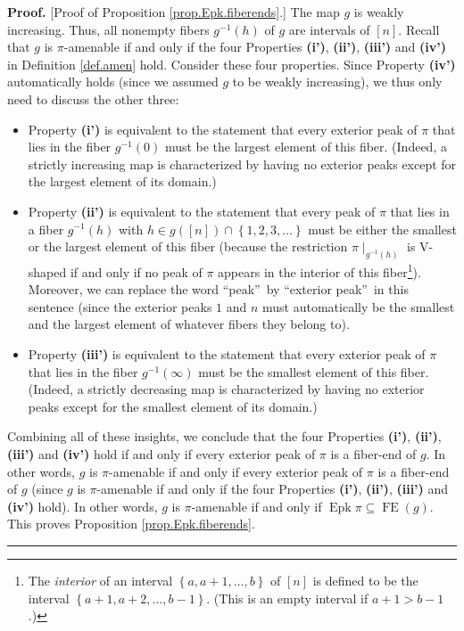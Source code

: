 \documentclass[numbers=enddot,12pt,final,onecolumn,notitlepage]{scrartcl}%
\theoremstyle{definition}
\newenvironment{proof}[1][Proof]{\noindent\textbf{#1.} }{\ \rule{0.5em}{0.5em}}
\newenvironment{vershort}{}{}
\begin{document}
\begin{vershort}
\begin{proof}
[Proof of Proposition \ref{prop.Epk.fiberends}.] The map $g$ is weakly
increasing. Thus, all nonempty fibers $g^{-1}\left(  h\right)  $ of $g$ are
intervals of $\left[  n\right]  $. Recall that $g$ is $\pi$-amenable if and
only if the four Properties \textbf{(i')}, \textbf{(ii')}, \textbf{(iii')} and
\textbf{(iv')} in Definition \ref{def.amen} hold. Consider these four
properties. Since Property \textbf{(iv')} automatically holds (since we
assumed $g$ to be weakly increasing), we thus only need to discuss the other three:

\begin{itemize}
\item Property \textbf{(i')} is equivalent to the statement that every
exterior peak of $\pi$ that lies in the fiber $g^{-1}\left(  0\right)  $ must
be the largest element of this fiber. (Indeed, a strictly increasing map is
characterized by having no exterior peaks except for the largest element
of its domain.)

\item Property \textbf{(ii')} is equivalent to the statement that every peak
of $\pi$ that lies in a fiber $g^{-1}\left(  h\right)  $ with $h\in g\left(
\left[  n\right]  \right)  \cap\left\{  1,2,3,\ldots\right\}  $ must be either
the smallest or the largest element of this fiber (because the restriction
$\pi\mid_{g^{-1}\left(  h\right)  }$ is V-shaped if and only if no peak of
$\pi$ appears in the interior of this fiber\footnote{The \textit{interior} of
an interval $\left\{  a,a+1,\ldots,b\right\}  $ of $\left[  n\right]  $ is
defined to be the interval $\left\{  a+1,a+2,\ldots,b-1\right\}  $. (This is
an empty interval if $a+1>b-1$.)}). Moreover, we can replace the word
\textquotedblleft peak\textquotedblright\ by \textquotedblleft exterior
peak\textquotedblright\ in this sentence (since the exterior peaks $1$ and $n$
must automatically be the smallest and the largest element of whatever fibers
they belong to).

\item Property \textbf{(iii')} is equivalent to the statement that every
exterior peak of $\pi$ that lies in the fiber $g^{-1}\left(  \infty\right)  $
must be the smallest element of this fiber. (Indeed, a strictly decreasing map
is characterized by having no exterior peaks except for the smallest element
of its domain.)
\end{itemize}

Combining all of these insights, we conclude that the four Properties
\textbf{(i')}, \textbf{(ii')}, \textbf{(iii')} and \textbf{(iv')} hold if and
only if every exterior peak of $\pi$ is a fiber-end of $g$. In other words,
$g$ is $\pi$-amenable if and only if every exterior peak of $\pi$ is a
fiber-end of $g$ (since $g$ is $\pi$-amenable if and only if the four
Properties \textbf{(i')}, \textbf{(ii')}, \textbf{(iii')} and \textbf{(iv')}
hold). In other words, $g$ is $\pi$-amenable if and only if
$\operatorname{Epk}\pi\subseteq\operatorname*{FE}\left(  g\right)  $. This
proves Proposition \ref{prop.Epk.fiberends}.
\end{proof}
\end{vershort}
\end{document}
